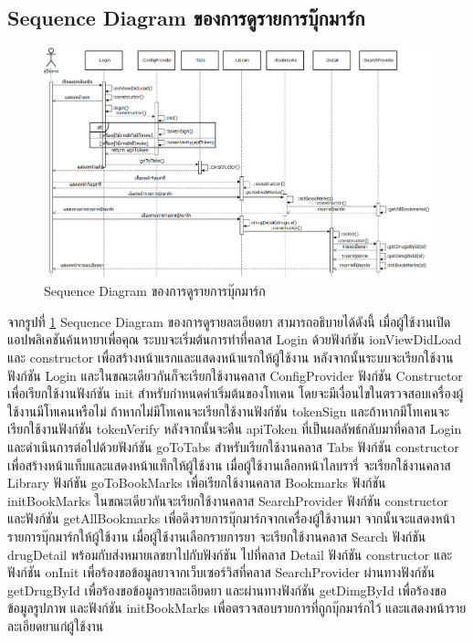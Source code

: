 	\subsection{Sequence Diagram ของการดูรายการบุ๊กมาร์ก}

	\begin{figure}[H]
		\includegraphics[width=\columnwidth]
		{Figures/3/Sequence-4}
		\caption{Sequence Diagram ของการดูรายการบุ๊กมาร์ก}
		\label{Fig:Sequence-4}
	\end{figure}

	จากรูปที่ \ref{Fig:Sequence-4} Sequence Diagram ของการดูรายละเอียดยา สามารถอธิบายได้ดังนี้ เมื่อผู้ใช้งานเปิดแอปพลิเคชันค้นหายาเพื่อคุณ ระบบจะเริ่มต้นการทำที่คลาส Login ด้วยฟังก์ชัน ionViewDidLoad และ constructor เพื่อสร้างหน้าแรกและแสดงหน้าแรกให้ผู้ใช้งาน หลังจากนั้นระบบจะเรียกใช้งานฟังก์ชัน Login และในขณะเดียวกันก็จะเรียกใช้งานคลาส ConfigProvider ฟังก์ชัน Constructor เพื่อเรียกใช้งานฟังก์ชัน init สำหรับกำหนดค่าเริ่มต้นของโทเคน โดยจะมีเงื่อนไขในตรวจสอบเครื่องผู้ใช้งานมีโทเคนหรือไม่ ถ้าหากไม่มีโทเคนจะเรียกใช้งานฟังก์ชัน tokenSign และถ้าหากมีโทเคนจะเรียกใช้งานฟังก์ชัน tokenVerify หลังจากนั้นจะคืน apiToken ที่เป็นผลลัพธ์กลับมาที่คลาส Login และดำเนินการต่อไปด้วยฟังก์ชัน goToTabs สำหรับเรียกใช้งานคลาส Tabs ฟังก์ชัน constructor เพื่อสร้างหน้าแท็บและแสดงหน้าแท็กให้ผู้ใช้งาน เมื่อผู้ใช้งานเลือกหน้าไลบรารี่ จะเรียกใช้งานคลาส Library ฟังก์ชัน goToBookMarks เพื่อเรียกใช้งานคลาส Bookmarks ฟังก์ชัน initBookMarks ในขณะเดียวกันจะเรียกใช้งานคลาส SearchProvider ฟังก์ชัน constructor และฟังก์ชัน getAllBookmarks เพื่อดึงรายการบุ๊กมาร์กจากเครื่องผู้ใช้งานมา จากนั้นจะแสดงหน้ารายการบุ๊กมาร์กให้ผู้ใช้งาน เมื่อผู้ใช้งานเลือกรายการยา จะเรียกใช้งานคลาส Search ฟังก์ชัน drugDetail พร้อมกับส่งหมายเลขยาไปกับฟังก์ชัน ไปที่คลาส Detail ฟังก์ชัน constructor และฟังก์ชัน onInit เพื่อร้องขอข้อมูลยาจากเว็บเซอร์วิสที่คลาส SearchProvider ผ่านทางฟังก์ชัน getDrugById เพื่อร้องขอข้อมูลรายละเอียดยา และผ่านทางฟังก์ชัน getDimgById เพื่อร้องขอข้อมูลรูปภาพ และฟังก์ชัน initBookMarks เพื่อตรวจสอบรายการที่ถูกบุ๊กมาร์กไว้ และแสดงหน้ารายละเอียดยาแก่ผู้ใช้งาน


